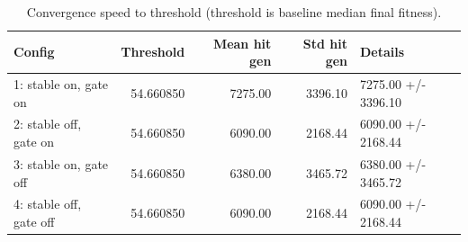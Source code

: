 \begin{table}[htbp]
\centering
\caption{Convergence speed to threshold (threshold is baseline median final fitness).}
\label{tab:convergence_speed}
\begin{tabular}{lrrrl}
\toprule
Config & Threshold & Mean hit gen & Std hit gen & Details \\
\midrule
1: stable on, gate on & 54.660850 & 7275.00 & 3396.10 & 7275.00 +/- 3396.10 \\
2: stable off, gate on & 54.660850 & 6090.00 & 2168.44 & 6090.00 +/- 2168.44 \\
3: stable on, gate off & 54.660850 & 6380.00 & 3465.72 & 6380.00 +/- 3465.72 \\
4: stable off, gate off & 54.660850 & 6090.00 & 2168.44 & 6090.00 +/- 2168.44 \\
\bottomrule
\end{tabular}
\end{table}
